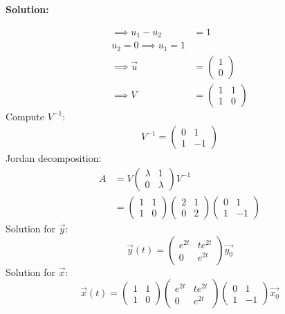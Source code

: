 \documentclass[12pt]{article}
\newenvironment{solution}{
    \textbf{Solution:}
    
}{
    
    \vspace{2em}
}
\begin{document}
\begin{solution}
\[\begin{aligned}
            \implies u_1 - u_2 &= 1\\
            u_2 = 0 \implies u_1 = 1\\
            \implies \vec{u} &= \begin{pmatrix}
                1 \\
                0
            \end{pmatrix}\\
            \implies V &= \begin{pmatrix}
                1 & 1 \\
                1 & 0
            \end{pmatrix}
        \end{aligned}
    \]
    Compute \(V^{-1}\):
    \[
        \begin{aligned}
            V^{-1} = \begin{pmatrix}
                0 & 1 \\
                1 & -1
            \end{pmatrix}
        \end{aligned}
    \]
    Jordan decomposition:
    \[
        \begin{aligned}
            A &= V \begin{pmatrix}
                \lambda & 1 \\
                0 & \lambda
            \end{pmatrix} V^{-1}\\
            &= \begin{pmatrix}
                1 & 1 \\
                1 & 0
            \end{pmatrix} \begin{pmatrix}
                2 & 1 \\
                0 & 2
            \end{pmatrix} \begin{pmatrix}
                0 & 1 \\
                1 & -1
            \end{pmatrix}
        \end{aligned}
    \]
    Solution for \(\vec{y}\):
    \[
        \vec{y}(t) = \begin{pmatrix}
            e^{2t} & te^{2t} \\
            0 & e^{2t}
        \end{pmatrix} \vec{y_0}
    \]
    Solution for \(\vec{x}\):
    \[
        \vec{x}(t) = \begin{pmatrix}
            1 & 1 \\
            1 & 0
        \end{pmatrix} \begin{pmatrix}
            e^{2t} & te^{2t} \\
            0 & e^{2t}
        \end{pmatrix} \begin{pmatrix} 
            0 & 1 \\
            1 & -1
        \end{pmatrix} \vec{x_0}
    \]


\end{solution}
\end{document}
